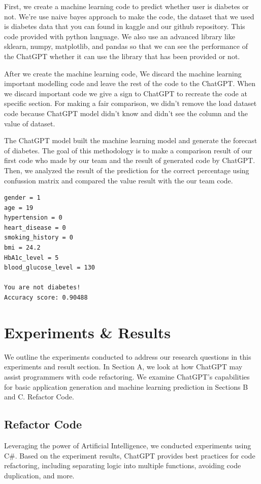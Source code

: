 \documentclass[conference]{IEEEtran}
\begin{document}
First, we create a machine learning code to predict whether user is diabetes or not. We're use naive bayes approach to make the code, the dataset that we used is diabetes data that you can found in kaggle and our github repository. This code provided with python language. We also use an advanced library like sklearn, numpy, matplotlib, and pandas so that we can see the performance of the ChatGPT whether it can use the library that has been provided or not. 

After we create the machine learning code, We discard the machine learning important modelling code and leave the rest of the code to the ChatGPT. When we discard important code we give a sign to ChatGPT to recreate the code at specific section. For making a fair comparison, we didn't remove the load dataset code because ChatGPT model didn't know and didn't see  the column and the value of dataset. 



The ChatGPT model  built the machine learning model and generate the forecast of diabetes. The goal of this methodology is to make a comparison result of our first code who made by our team and the result of generated code by ChatGPT. Then, we analyzed the result of the prediction for the correct percentage using confussion matrix and compared the value result with the our team code.

\begin{lstlisting}[caption={Given Input \& Our Diabetes Result}, basicstyle=\scriptsize\ttfamily]
gender = 1
age = 19
hypertension = 0
heart_disease = 0
smoking_history = 0
bmi = 24.2
HbA1c_level = 5
blood_glucose_level = 130

You are not diabetes!
Accuracy score: 0.90488
\end{lstlisting}

\section{Experiments \& Results}
We outline the experiments conducted to address our research questions in this experiments and result   section. In Section A, we look at how ChatGPT may assist programmers with code refactoring. We examine ChatGPT's capabilities for basic application generation and machine learning prediction in Sections B and C. Refactor Code.

\subsection{Refactor Code}
Leveraging the power of Artificial Intelligence, we conducted experiments using C\#. Based on the experiment results, ChatGPT provides best practices for code refactoring, including separating logic into multiple functions, avoiding code duplication, and more.
\end{document}
